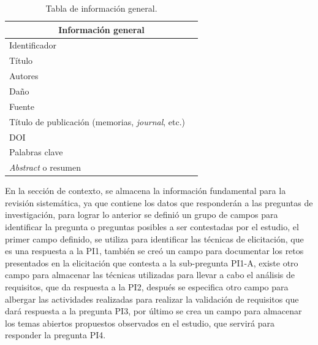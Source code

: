 \documentclass[conference,onecolumn,10pt]{IEEEtran}
\begin{document}
\begin{table}[h!]
    \begin{center}
    \caption{Tabla de información general.}
    \label{tab:datosgenerales}
    \begin{tabular}{|l|c|} 
    \hline
    \multicolumn{2}{|c|}{Información general} \\
    \hline
    Identificador &       \\
    \hline
    Título & \\
    \hline
    Autores &\\
    \hline
    Daño & \\
    \hline
    Fuente & \\
    \hline
    Título de publicación (memorias, \emph{journal}, etc.) & \\
    \hline
    DOI & \\
    \hline
    Palabras clave & \\
    \hline
    \emph{Abstract} o resumen & \\
    \hline
    \end{tabular}
    \end{center}
\end{table}

En la sección de contexto, se almacena la información fundamental para la revisión sistemática, ya que contiene los datos que responderán a las
preguntas de investigación, para lograr lo anterior se definió un grupo de campos para identificar la pregunta o preguntas posibles a ser contestadas 
por el estudio, el primer campo definido, se utiliza para identificar las técnicas de elicitación, que es una respuesta a la PI1, también se creó un campo para 
documentar los retos presentados en la elicitación que contesta a la sub-pregunta PI1-A, existe otro campo para almacenar las técnicas utilizadas para llevar a cabo 
el análisis de requisitos, que da respuesta a la PI2, después se especifica otro campo para albergar las actividades realizadas para realizar la validación de requisitos que 
dará respuesta a la pregunta PI3, por último se crea un campo para almacenar los temas abiertos propuestos observados en el estudio, que servirá para responder la pregunta PI4.
\end{document}

